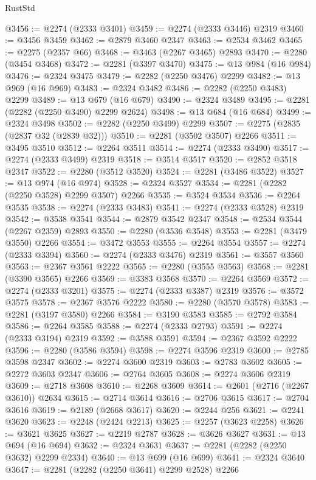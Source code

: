 \begin{lexlean}{RustStd}
\begin{coremodule}
@3456 := @2274 (@2333 @3401)
@3459 := @2274 (@2333 @3446) @2319
@3460 := @3456 @3459
@3462 := @2879 @3460 @2347
@3463 := @2534 @3462
@3465 := @2275 (@2357 @66)
@3468 := @3463 (@2267 @3465) @2893
@3470 := @2280 (@3454 @3468)
@3472 := @2281 (@3397 @3470)
@3475 := @13 @984 (@16 @984)
@3476 := @2324 @3475
@3479 := @2282 (@2250 @3476) @2299
@3482 := @13 @969 (@16 @969)
@3483 := @2324 @3482
@3486 := @2282 (@2250 @3483) @2299
@3489 := @13 @679 (@16 @679)
@3490 := @2324 @3489
@3495 := @2281 (@2282 (@2250 @3490) @2299 @2624)
@3498 := @13 @684 (@16 @684)
@3499 := @2324 @3498
@3502 := @2282 (@2250 @3499) @2299
@3507 := @2275 (@2835 (@2837 @32 (@2839 @32)))
@3510 := @2281 (@3502 @3507) @2266
@3511 := @3495 @3510
@3512 := @2264 @3511
@3514 := @2274 (@2333 @3490)
@3517 := @2274 (@2333 @3499) @2319
@3518 := @3514 @3517
@3520 := @2852 @3518 @2347
@3522 := @2280 (@3512 @3520)
@3524 := @2281 (@3486 @3522)
@3527 := @13 @974 (@16 @974)
@3528 := @2324 @3527
@3534 := @2281 (@2282 (@2250 @3528) @2299 @3507) @2266
@3535 := @3524 @3534
@3536 := @2264 @3535
@3538 := @2274 (@2333 @3483)
@3541 := @2274 (@2333 @3528) @2319
@3542 := @3538 @3541
@3544 := @2879 @3542 @2347
@3548 := @2534 @3544 (@2267 @2359) @2893
@3550 := @2280 (@3536 @3548)
@3553 := @2281 (@3479 @3550) @2266
@3554 := @3472 @3553
@3555 := @2264 @3554
@3557 := @2274 (@2333 @3394)
@3560 := @2274 (@2333 @3476) @2319
@3561 := @3557 @3560
@3563 := @2367 @3561 @2222
@3565 := @2280 (@3555 @3563)
@3568 := @2281 (@3390 @3565) @2266
@3569 := @3383 @3568
@3570 := @2264 @3569
@3572 := @2274 (@2333 @3201)
@3575 := @2274 (@2333 @3387) @2319
@3576 := @3572 @3575
@3578 := @2367 @3576 @2222
@3580 := @2280 (@3570 @3578)
@3583 := @2281 (@3197 @3580) @2266
@3584 := @3190 @3583
@3585 := @2792 @3584
@3586 := @2264 @3585
@3588 := @2274 (@2333 @2793)
@3591 := @2274 (@2333 @3194) @2319
@3592 := @3588 @3591
@3594 := @2367 @3592 @2222
@3596 := @2280 (@3586 @3594)
@3598 := @2274 @3596 @2319
@3600 := @2785 @3598 @2347
@3602 := @2274 @3600 @2319
@3603 := @2783 @3602
@3605 := @2272 @3603 @2347
@3606 := @2764 @3605
@3608 := @2274 @3606 @2319
@3609 := @2718 @3608
@3610 := @2268 @3609
@3614 := @2601 (@2716 (@2267 @3610)) @2634
@3615 := @2714 @3614
@3616 := @2706 @3615
@3617 := @2704 @3616
@3619 := @2189 (@2668 @3617)
@3620 := @2244 @256
@3621 := @2241 @3620
@3623 := @2248 (@2424 @2213)
@3625 := @2257 (@3623 @2258)
@3626 := @3621 @3625
@3627 := @2219 @2787
@3628 := @3626 @3627
@3631 := @13 @694 (@16 @694)
@3632 := @2324 @3631
@3637 := @2281 (@2282 (@2250 @3632) @2299 @2334)
@3640 := @13 @699 (@16 @699)
@3641 := @2324 @3640
@3647 := @2281 (@2282 (@2250 @3641) @2299 @2528) @2266

\end{coremodule}
\end{lexlean}
